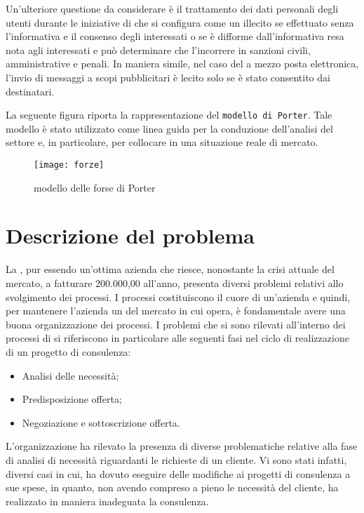 Un'ulteriore questione da considerare è il trattamento dei dati personali degli utenti durante le iniziative di \mktg che si configura come un illecito se effettuato senza l'informativa e il consenso degli interessati o se è difforme dall'informativa resa nota agli interessati e può determinare che l'incorrere in sanzioni civili, amministrative e penali. In maniera simile, nel caso del \mktg a mezzo posta elettronica, l'invio di messaggi a scopi pubblicitari è lecito solo se è stato consentito dai destinatari.



La seguente figura riporta la rappresentazione del \texttt{modello di Porter}. Tale modello è stato utilizzato come linea guida per la conduzione dell'analisi del settore e, in particolare, per collocare \customer in una situazione reale di mercato.



\begin{figure}[H]
  \centering
  
  \label{fig:forze}
  \texttt{[image: forze]}
  \caption{modello delle forse di Porter}
\end{figure}

\section{Descrizione del problema}
La \customer , pur essendo un'ottima azienda che riesce, nonostante la crisi attuale del mercato, a fatturare  200.000,00 \text{\euro} all'anno, presenta diversi problemi relativi allo svolgimento dei processi.
I processi costituiscono il cuore di un'azienda e quindi, per mantenere l'azienda un  del mercato in cui opera, è fondamentale avere una buona organizzazione dei processi.
I problemi che si sono rilevati all'interno dei processi di \customer si riferiscono in particolare alle seguenti fasi nel ciclo di realizzazione di un progetto di consulenza:
\begin{itemize}
	\item Analisi delle necessità;
	\item Predisposizione offerta;
	\item Negoziazione e sottoscrizione offerta.
\end{itemize}

L'organizzazione ha rilevato la presenza di diverse problematiche relative alla fase di analisi di necessità riguardanti le richieste di un cliente. Vi sono stati infatti, diversi casi in cui, \customer  ha dovuto eseguire delle modifiche ai progetti di consulenza a sue spese, in quanto, non avendo compreso a pieno le necessità del cliente, ha  realizzato in maniera inadeguata la consulenza. 

